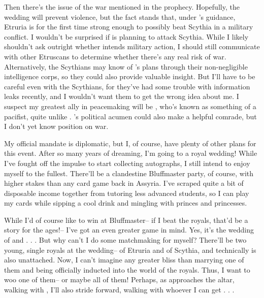 \documentclass[char]{Kos}
\begin{document}
Then there's the issue of the war mentioned in the prophecy. Hopefully, the wedding will prevent violence, but the fact stands that, under \cEtruriaKing{\nickname}'s guidance, Etruria is for the first time strong enough to possibly beat Scythia in a military conflict. I wouldn't be surprised if \cEtruriaKing{\nickname} is planning to attack Scythia. While I likely shouldn't ask \cEtruriaKing{\them} outright whether \cEtruriaKing{\they} intends military action, I should still communicate with other Etruscans to determine whether there's any real risk of war. Alternatively, the Scythians may know of \cEtruriaKing{\nickname}'s plans through their non-negligible intelligence corps, so they could also provide valuable insight. But I'll have to be careful even with the Scythians, for they've had some trouble with information leaks recently, and I wouldn't want them to get the wrong idea about me. I suspect my greatest ally in peacemaking will be \cGroom{\Prince} \cGroom{\nickname}, who's known as something of a pacifist, quite unlike \cGroom{\their} \cEtruriaKing{\parent}. \cBride{\nickname}'s political acumen could also make \cBride{\them} a helpful comrade, but I don't yet know \cBride{\their} position on war.

My official mandate is diplomatic, but I, of course, have plenty of other plans for this event. After so many years of dreaming, I'm going to a royal wedding! While I've fought off the impulse to start collecting autographs, I still intend to enjoy myself to the fullest. There'll be a clandestine Bluffmaster party, of course, with higher stakes than any card game back in Assyria. I've scraped quite a bit of disposable income together from tutoring less advanced students, so I can play my cards while sipping a cool drink and mingling with princes and princesses.

While I'd of course like to win at Bluffmaster-- if I beat the royals, that'd be a story for the ages!-- I've got an even greater game in mind. Yes, it's the wedding of \cBride{\nickname} and \cGroom{\nickname} . . . But why can't I do some matchmaking for myself? There'll be two young, single royals at the wedding-- \cPoet{\nickname} of Etruria and \cWard{\nickname} of Scythia, and technically \cEtruriaKing{\nickname} is also unattached. Now, I can't imagine any greater bliss than marrying one of them and being officially inducted into the world of the royals. Thus, I want to woo one of them-- or maybe all of them! Perhaps, as \cBride{\nickname} approaches the altar, walking with \cGroom{\nickname}, I'll also stride forward, walking with whoever I can get . . .
\end{document}
